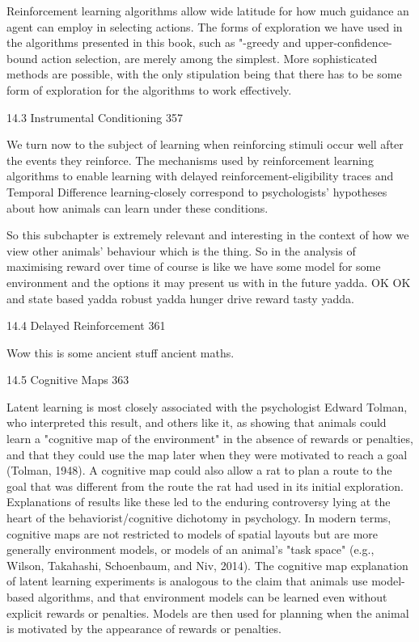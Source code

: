 Reinforcement learning algorithms allow wide latitude for how much guidance an agent can employ in selecting actions. The forms of exploration we have used in the algorithms presented in this book, such as "-greedy and upper-confidence-bound action selection, are merely among the simplest. More sophisticated methods are possible, with the only stipulation being that there has to be some form of exploration for the algorithms to work effectively.

14.3 Instrumental Conditioning 357

We turn now to the subject of learning when reinforcing stimuli occur well after the events they reinforce. The mechanisms used by reinforcement learning algorithms to enable learning with delayed reinforcement-eligibility traces and Temporal Difference learning-closely correspond to psychologists' hypotheses about how animals can learn under these conditions.

So this subchapter is extremely relevant and interesting in the context of how we view other animals' behaviour which is the thing. So in the analysis of maximising reward over time of course is like we have some model for some environment and the options it may present us with in the future yadda. OK OK and state based yadda robust yadda hunger drive reward tasty yadda.

14.4 Delayed Reinforcement 361

Wow this is some ancient stuff ancient maths.

14.5 Cognitive Maps 363

Latent learning is most closely associated with the psychologist Edward Tolman, who interpreted this result, and others like it, as showing that animals could learn a "cognitive map of the environment" in the absence of rewards or penalties, and that they could use the map later when they were motivated to reach a goal (Tolman, 1948). A cognitive map could also allow a rat to plan a route to the goal that was different from the route the rat had used in its initial exploration. Explanations of results like these led to the enduring controversy lying at the heart of the behaviorist/cognitive dichotomy in psychology. In modern terms, cognitive maps are not restricted to models of spatial layouts but are more generally environment models, or models of an animal's "task space" (e.g., Wilson, Takahashi, Schoenbaum, and Niv, 2014). The cognitive map explanation of latent learning experiments is analogous to the claim that animals use model-based algorithms, and that environment models can be learned even without explicit rewards or penalties. Models are then used for planning when the animal is motivated by the appearance of rewards or penalties.

